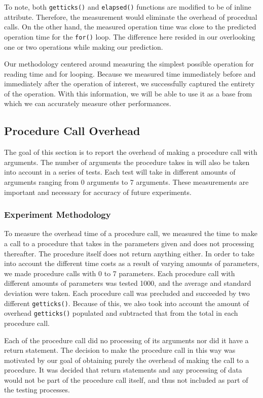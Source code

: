 \documentclass{article} %
\begin{document}
To note, both \texttt{getticks()} and \texttt{elapsed()} functions are
modified to be of inline attribute. Therefore, the measurement would eliminate
the overhead of procedual calls. On the other hand, the measured operation
time was close to the predicted operation time for the \texttt{for()} loop.
The difference here resided in our overlooking one or two operations while
making our prediction.

Our methodology centered around measuring the simplest possible operation for
reading time and for looping. Because we measured time immediately before and
immediately after the operation of interest, we successfully captured the
entirety of the operation. With this information, we will be able to use it as
a base from which we can accurately measure other performances.

\subsection{Procedure Call Overhead}
The goal of this section is to report the overhead of making a procedure call
with arguments. The number of arguments the procedure takes in will also be
taken into account in a series of tests. Each test will take in different
amounts of arguments ranging from 0 arguments to 7 arguments. These
measurements are important and necessary for accuracy of future experiments.

\subsubsection{Experiment Methodology}
To measure the overhead time of a procedure call, we measured the time to make
a call to a procedure that takes in the parameters given and does not
processing thereafter. The procedure itself does not return anything either.
In order to take into account the different time costs as a result of varying
amounts of parameters, we made procedure calls with 0 to 7 parameters. Each
procedure call with different amounts of parameters was tested 1000, and the
average and standard deviation were taken. Each procedure call was precluded
and succeeded by two different \texttt{getticks()}. Because of this, we also
took into account the amount of overhead \texttt{getticks()} populated and
subtracted that from the total in each procedure call.

Each of the procedure call did no processing of its arguments nor did it have
a return statement. The decision to make the procedure call in this way was
motivated by our goal of obtaining purely the overhead of making the call to
a procedure. It was decided that return statements and any processing of data
would not be part of the procedure call itself, and thus not included as part
of the testing processes.
\end{document}
